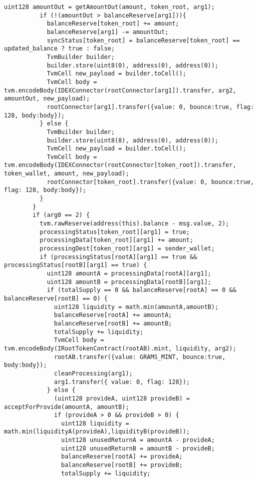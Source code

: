 \begin{lstlisting}[firstnumber=248]
          uint128 amountOut = getAmountOut(amount, token_root, arg1);
          if (!(amountOut > balanceReserve[arg1])){
            balanceReserve[token_root] += amount;
            balanceReserve[arg1] -= amountOut;
            syncStatus[token_root] = balanceReserve[token_root] == updated_balance ? true : false;
            TvmBuilder builder;
            builder.store(uint8(0), address(0), address(0));
            TvmCell new_payload = builder.toCell();
            TvmCell body = tvm.encodeBody(IDEXConnector(rootConnector[arg1]).transfer, arg2, amountOut, new_payload);
            rootConnector[arg1].transfer({value: 0, bounce:true, flag: 128, body:body});
          } else {
            TvmBuilder builder;
            builder.store(uint8(8), address(0), address(0));
            TvmCell new_payload = builder.toCell();
            TvmCell body = tvm.encodeBody(IDEXConnector(rootConnector[token_root]).transfer, token_wallet, amount, new_payload);
            rootConnector[token_root].transfer({value: 0, bounce:true, flag: 128, body:body});
          }
        }
        if (arg0 == 2) {
          tvm.rawReserve(address(this).balance - msg.value, 2);
          processingStatus[token_root][arg1] = true;
          processingData[token_root][arg1] += amount;
          processingDest[token_root][arg1] = sender_wallet;
          if (processingStatus[rootA][arg1] == true && processingStatus[rootB][arg1] == true) {
            uint128 amountA = processingData[rootA][arg1];
            uint128 amountB = processingData[rootB][arg1];
            if (totalSupply == 0 && balanceReserve[rootA] == 0 && balanceReserve[rootB] == 0) {
              uint128 liquidity = math.min(amountA,amountB);
              balanceReserve[rootA] += amountA;
              balanceReserve[rootB] += amountB;
              totalSupply += liquidity;
              TvmCell body = tvm.encodeBody(IRootTokenContract(rootAB).mint, liquidity, arg2);
              rootAB.transfer({value: GRAMS_MINT, bounce:true, body:body});
              cleanProcessing(arg1);
              arg1.transfer({ value: 0, flag: 128});
            } else {
              (uint128 provideA, uint128 provideB) = acceptForProvide(amountA, amountB);
              if (provideA > 0 && provideB > 0) {
                uint128 liquidity = math.min(liquidityA(provideA),liquidityB(provideB));
                uint128 unusedReturnA = amountA - provideA;
                uint128 unusedReturnB = amountB - provideB;
                balanceReserve[rootA] += provideA;
                balanceReserve[rootB] += provideB;
                totalSupply += liquidity;

\end{lstlisting}
